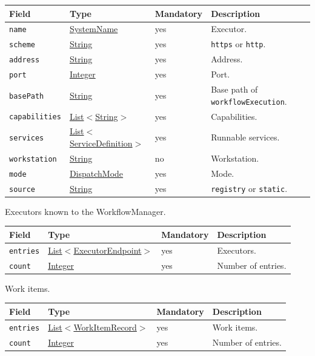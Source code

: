 \documentclass[a4paper]{arrowhead}
\newcommand{\mref}[1]{{\textcolor{ArrowheadPurple}{\hyperref[sec:model:#1]{#1}}}}
\newcommand{\pref}[1]{{\textcolor{ArrowheadGrey}{\hyperref[sec:model:primitives:#1]{#1}}}}
\begin{document}
{\small
\begin{longtable}{|p{3.7cm}|p{4.2cm}|p{1.6cm}|p{6.3cm}|}

\hline
\rowcolor{gray!33} Field & Type & Mandatory & Description \\ \hline
\endhead
\texttt{name} & \pref{SystemName} & yes & Executor. \\ \hline
\texttt{scheme} & \pref{String} & yes & \texttt{https} or \texttt{http}. \\ \hline
\texttt{address} & \pref{String} & yes & Address. \\ \hline
\texttt{port} & \pref{Integer} & yes & Port. \\ \hline
\texttt{basePath} & \pref{String} & yes & Base path of \texttt{workflow\allowbreak{}Execution}. \\ \hline
\texttt{capabilities} & \pref{List}$<$\pref{String}$>$ & yes & Capabilities. \\ \hline
\texttt{services} & \pref{List}$<$\pref{ServiceDefinition}$>$ & yes & Runnable services. \\ \hline
\texttt{workstation} & \pref{String} & no & Workstation. \\ \hline
\texttt{mode} & \mref{DispatchMode} & yes & Mode. \\ \hline
\texttt{source} & \pref{String} & yes & \texttt{registry} or \texttt{static}. \\ \hline
\end{longtable}
}

Executors known to the WorkflowManager.

{\small
\begin{longtable}{|p{3.7cm}|p{4.2cm}|p{1.6cm}|p{6.3cm}|}

\hline
\rowcolor{gray!33} Field & Type & Mandatory & Description \\ \hline
\endhead
\texttt{entries} & \pref{List}$<$\mref{ExecutorEndpoint}$>$ & yes & Executors. \\ \hline
\texttt{count} & \pref{Integer} & yes & Number of entries. \\ \hline
\end{longtable}
}

Work items.

{\small
\begin{longtable}{|p{3.7cm}|p{4.2cm}|p{1.6cm}|p{6.3cm}|}

\hline
\rowcolor{gray!33} Field & Type & Mandatory & Description \\ \hline
\endhead
\texttt{entries} & \pref{List}$<$\mref{WorkItemRecord}$>$ & yes & Work items. \\ \hline
\texttt{count} & \pref{Integer} & yes & Number of entries. \\ \hline
\end{longtable}
}
\end{document}
